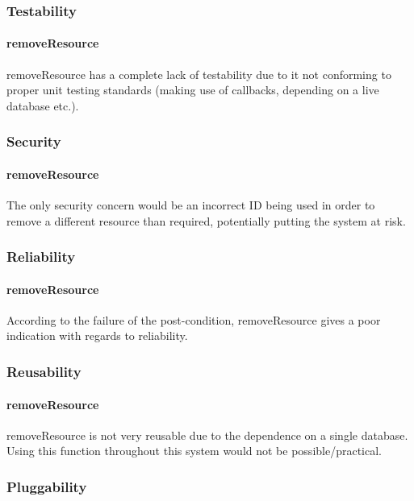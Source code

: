 \documentclass[a4paper]{article}
\begin{document}
\subsubsection {Testability}

\paragraph{removeResource}
removeResource has a complete lack of testability due to it not conforming to proper unit testing standards (making use of callbacks, depending on a live database etc.).

\subsubsection {Security}

\paragraph{removeResource}
The only security concern would be an incorrect ID being used in order to remove a different resource than required, potentially putting the system at risk.

\subsubsection {Reliability}

\paragraph{removeResource}
According to the failure of the post-condition, removeResource gives a poor indication with regards to reliability.

\subsubsection {Reusability}

\paragraph{removeResource}
removeResource is not very reusable due to the dependence on a single database. Using this function throughout this system would not be possible/practical.

\subsubsection {Pluggability}
\end{document}
